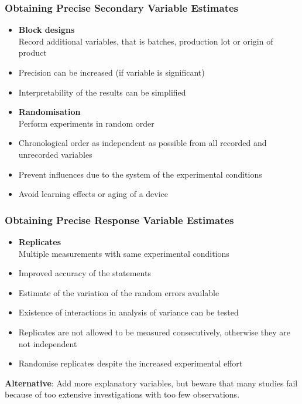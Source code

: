 \documentclass[11pt]{article}
\theoremstyle{definition}
\begin{document}
\subsubsection{Obtaining Precise Secondary Variable Estimates}
\begin{itemize}
	\item[] \textbf{Block designs}\\
	Record additional variables, that is batches, production lot or origin of product
	\item Precision can be increased (if variable is significant)
	\item Interpretability of the results can be simplified
	\item[] \textbf{Randomisation}\\
	Perform experiments in random order
	\item Chronological order as independent as possible from all recorded and unrecorded variables
	\item Prevent influences due to the system of the experimental conditions
	\item Avoid learning effects or aging of a device
\end{itemize}

\subsubsection{Obtaining Precise Response Variable Estimates}
\begin{itemize}
	\item[] \textbf{Replicates}\\
	Multiple measurements with same experimental conditions
	\item Improved accuracy of the statements
	\item Estimate of the variation of the random errors available
	\item Existence of interactions in analysis of variance can be tested
	\item Replicates are not allowed to be measured consecutively, otherwise they are not independent
	\item Randomise replicates despite the increased experimental effort
\end{itemize}
\textbf{Alternative}: Add more explanatory variables, but beware that many studies fail because of too extensive investigations with too few observations.
\end{document}
